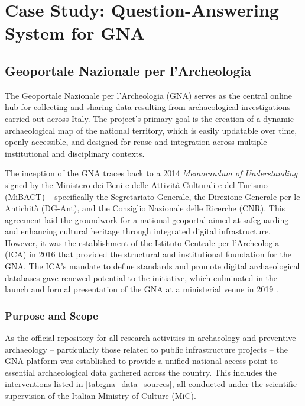 \chapter{Case Study: Question-Answering System for GNA}
\label{chap:casestudy}
\sloppy
\begin{spacing}{1.5} 

\section{Geoportale Nazionale per l’Archeologia}
The Geoportale Nazionale per l'Archeologia (GNA) \citep{mic_mic_2019} serves as the central online hub for collecting and sharing data resulting from archaeological investigations carried out across Italy. The project's primary goal is the creation of a dynamic archaeological map of the national territory, which is easily updatable over time, openly accessible, and designed for reuse and integration across multiple institutional and disciplinary contexts.

The inception of the GNA traces back to a 2014 \textit{Memorandum of Understanding} signed by the Ministero dei Beni e delle Attività Culturali e del Turismo (MiBACT) -- specifically the Segretariato Generale, the Direzione Generale per le Antichità (DG-Ant), and the Consiglio Nazionale delle Ricerche (CNR). This agreement laid the groundwork for a national geoportal aimed at safeguarding and enhancing cultural heritage through integrated digital infrastructure. However, it was the establishment of the Istituto Centrale per l’Archeologia (ICA) in 2016 that provided the structural and institutional foundation for the GNA. The ICA’s mandate to define standards and promote digital archaeological databases gave renewed potential to the initiative, which culminated in the launch and formal presentation of the GNA at a ministerial venue in 2019 \citep{calandra_il_2023}.

\subsection{Purpose and Scope}
As the official repository for all research activities in archaeology and preventive archaeology -- particularly those related to public infrastructure projects -- the GNA platform was established to provide a unified national access point to essential archaeological data gathered across the country. This includes the interventions listed in \autoref{tab:gna_data_sources}, all conducted under the scientific supervision of the Italian Ministry of Culture (MiC).


\end{spacing}
